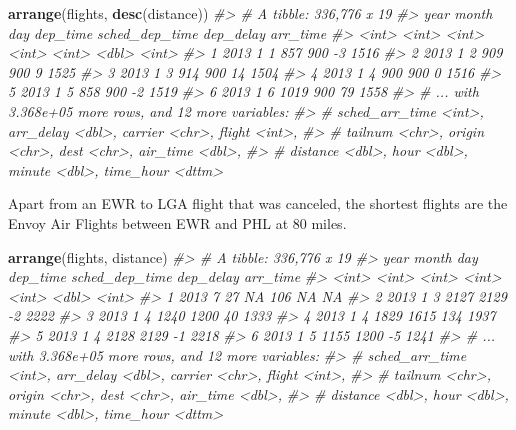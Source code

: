 \documentclass[]{book}
\newenvironment{Shaded}{\begin{snugshade}}{\end{snugshade}}
\newcommand{\CommentTok}[1]{\textcolor[rgb]{0.56,0.35,0.01}{\textit{#1}}}
\newcommand{\KeywordTok}[1]{\textcolor[rgb]{0.13,0.29,0.53}{\textbf{#1}}}
\newcommand{\NormalTok}[1]{#1}
\theoremstyle{plain}
\theoremstyle{remark}
\begin{document}
\begin{Shaded}
\begin{Highlighting}[]
\KeywordTok{arrange}\NormalTok{(flights, }\KeywordTok{desc}\NormalTok{(distance))}
\CommentTok{#> # A tibble: 336,776 x 19}
\CommentTok{#>    year month   day dep_time sched_dep_time dep_delay arr_time}
\CommentTok{#>   <int> <int> <int>    <int>          <int>     <dbl>    <int>}
\CommentTok{#> 1  2013     1     1      857            900        -3     1516}
\CommentTok{#> 2  2013     1     2      909            900         9     1525}
\CommentTok{#> 3  2013     1     3      914            900        14     1504}
\CommentTok{#> 4  2013     1     4      900            900         0     1516}
\CommentTok{#> 5  2013     1     5      858            900        -2     1519}
\CommentTok{#> 6  2013     1     6     1019            900        79     1558}
\CommentTok{#> # ... with 3.368e+05 more rows, and 12 more variables:}
\CommentTok{#> #   sched_arr_time <int>, arr_delay <dbl>, carrier <chr>, flight <int>,}
\CommentTok{#> #   tailnum <chr>, origin <chr>, dest <chr>, air_time <dbl>,}
\CommentTok{#> #   distance <dbl>, hour <dbl>, minute <dbl>, time_hour <dttm>}
\end{Highlighting}
\end{Shaded}

Apart from an EWR to LGA flight that was canceled, the shortest flights
are the Envoy Air Flights between EWR and PHL at 80 miles.

\begin{Shaded}
\begin{Highlighting}[]
\KeywordTok{arrange}\NormalTok{(flights, distance)}
\CommentTok{#> # A tibble: 336,776 x 19}
\CommentTok{#>    year month   day dep_time sched_dep_time dep_delay arr_time}
\CommentTok{#>   <int> <int> <int>    <int>          <int>     <dbl>    <int>}
\CommentTok{#> 1  2013     7    27       NA            106        NA       NA}
\CommentTok{#> 2  2013     1     3     2127           2129        -2     2222}
\CommentTok{#> 3  2013     1     4     1240           1200        40     1333}
\CommentTok{#> 4  2013     1     4     1829           1615       134     1937}
\CommentTok{#> 5  2013     1     4     2128           2129        -1     2218}
\CommentTok{#> 6  2013     1     5     1155           1200        -5     1241}
\CommentTok{#> # ... with 3.368e+05 more rows, and 12 more variables:}
\CommentTok{#> #   sched_arr_time <int>, arr_delay <dbl>, carrier <chr>, flight <int>,}
\CommentTok{#> #   tailnum <chr>, origin <chr>, dest <chr>, air_time <dbl>,}
\CommentTok{#> #   distance <dbl>, hour <dbl>, minute <dbl>, time_hour <dttm>}
\end{Highlighting}
\end{Shaded}
\end{document}
